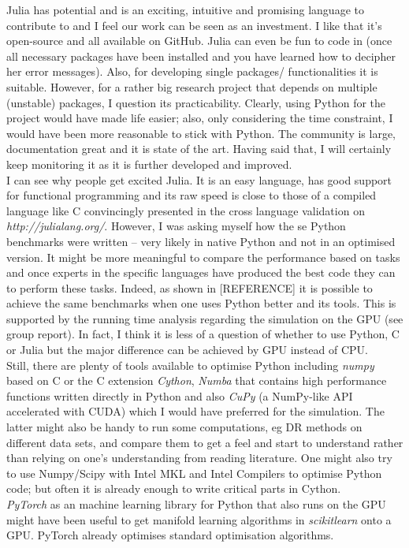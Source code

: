 \documentclass[journal, a4paper]{IEEEtran}
\begin{document}
Julia has potential and is an exciting, intuitive and promising language to contribute to and I feel our work can be seen as an investment. I like that it's open-source and all available on GitHub. Julia can even be fun to code in (once all necessary packages have been installed and you have learned how to decipher her error messages). Also, for developing single packages/ functionalities it is suitable. However, for a rather big research project that depends on multiple (unstable) packages, I question its practicability.
Clearly, using Python for the project would have made life easier; also, only considering the time constraint, I would have been more reasonable to stick with Python. The community is large, documentation great and it is state of the art. 
Having said that, I will certainly keep monitoring it as it is further developed and improved. \\


I can see why people get excited Julia. It is an easy language, has good support for functional programming and its raw speed is close to those of a compiled language like C convincingly presented in the cross language validation on \textit{http://julialang.org/}. 
However, I was asking myself how the se Python benchmarks were written -- very likely in native Python and not in an optimised version. It might be more meaningful to compare the performance based on tasks and once experts in the specific languages have produced the best code they can to perform these tasks. Indeed, as shown in [REFERENCE] it is possible to achieve the same benchmarks when one uses Python better and its tools. This is supported by the running time analysis regarding the simulation on the GPU (see group report).
In fact, I think it is less of a question of whether to use Python, C or Julia but the major difference can be achieved by GPU instead of CPU.\\
Still, there are plenty of tools available to optimise Python including \textit{numpy} based on C or the C extension \textit{Cython}, \textit{Numba} that contains high performance functions written directly in Python and also \textit{CuPy} (a NumPy-like API accelerated with CUDA) which I would have preferred for the simulation. The latter might also be handy to run some computations, eg DR methods on different data sets, and compare them to get a feel and start to understand rather than relying on one's understanding from reading literature. One might also try to use Numpy/Scipy with Intel MKL and Intel Compilers to optimise Python code; but often it is already enough to write critical parts in Cython.\\
\textit{PyTorch} as an machine learning library for Python that also runs on the GPU might have been useful to get manifold learning algorithms in \textit{scikitlearn} onto a GPU. PyTorch already optimises standard optimisation algorithms.  \\
\end{document}
